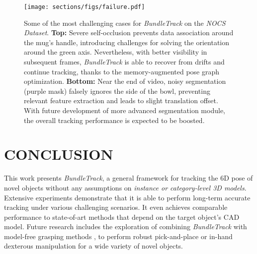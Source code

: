 \documentclass[letterpaper, 10 pt, conference]{ieeeconf}
\begin{document}
\begin{figure}[h]
  \centering
  \texttt{[image: sections/figs/failure.pdf]}
  
  \vspace{-0.1in}\caption{Some of the most challenging cases for \textit{BundleTrack} on the \textit{NOCS Dataset}. \textbf{Top:} Severe self-occlusion prevents data association around the mug's handle, introducing challenges for solving the orientation around the green axis. Nevertheless, with better visibility in subsequent frames, \textit{BundleTrack} is able to recover from drifts and continue tracking, thanks to the memory-augmented pose graph optimization. \textbf{Bottom:} Near the end of video, noisy segmentation (purple mask) falsely ignores the side of the bowl, preventing relevant feature extraction and leads to slight translation offset. With future development of more advanced segmentation module, the overall tracking performance is expected to be boosted.}
  \label{fig:failure}
\end{figure}
 

\section{CONCLUSION}
\vspace{-0.05in}
This  work  presents \textit{BundleTrack}, a general framework for tracking the 6D pose of novel objects without any assumptions on \textit{instance or category-level 3D models}. Extensive experiments demonstrate that it is able to perform long-term accurate tracking under various challenging scenarios. It even achieves comparable performance to state-of-art methods that depend on the target object's CAD model. Future research includes the exploration of combining \textit{BundleTrack} with model-free grasping methods \cite{ten2017grasp, murali20206}, to perform robust pick-and-place \cite{morgan2021visiondriven,mitash2020task} or in-hand dexterous manipulation for a wide variety of novel objects. 





\end{document}
